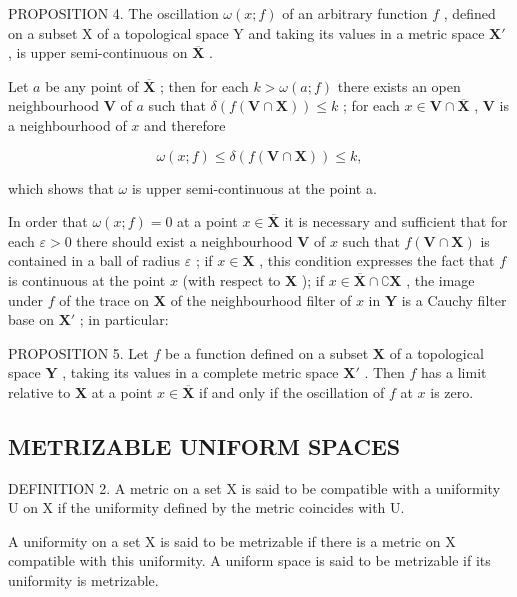PROPOSITION 4. The oscillation \(\omega(x; f)\) of an arbitrary function \(f\) , defined on a subset X of a topological space Y and taking its values in a metric space \(\mathbf{X}'\) , is upper semi-continuous on \(\overline{\mathbf{X}}\) .

Let \(a\) be any point of \(\overline{\mathbf{X}}\) ; then for each \(k > \omega(a; f)\) there exists an open neighbourhood \(\mathbf{V}\) of \(a\) such that \(\delta(f(\mathbf{V} \cap \mathbf{X})) \leqslant k\) ; for each \(x \in \mathbf{V} \cap \overline{\mathbf{X}}\) , \(\mathbf{V}\) is a neighbourhood of \(x\) and therefore

\[
\omega (x; f) \leqslant \delta (f (\mathbf {V} \cap \mathbf {X})) \leqslant k,
\]

which shows that \(\omega\) is upper semi-continuous at the point a.

In order that \(\omega(x; f) = 0\) at a point \(x \in \overline{\mathbf{X}}\) it is necessary and sufficient that for each \(\varepsilon > 0\) there should exist a neighbourhood \(\mathbf{V}\) of \(x\) such that \(f(\mathbf{V} \cap \mathbf{X})\) is contained in a ball of radius \(\varepsilon\) ; if \(x \in \mathbf{X}\) , this condition expresses the fact that \(f\) is continuous at the point \(x\) (with respect to \(\mathbf{X}\) ); if \(x \in \overline{\mathbf{X}} \cap \complement \mathbf{X}\) , the image under \(f\) of the trace on \(\mathbf{X}\) of the neighbourhood filter of \(x\) in \(\mathbf{Y}\) is a Cauchy filter base on \(\mathbf{X}'\) ; in particular:

PROPOSITION 5. Let \(f\) be a function defined on a subset \(\mathbf{X}\) of a topological space \(\mathbf{Y}\) , taking its values in a complete metric space \(\mathbf{X}'\) . Then \(f\) has a limit relative to \(\mathbf{X}\) at a point \(x \in \overline{\mathbf{X}}\) if and only if the oscillation of \(f\) at \(x\) is zero.

\subsection{METRIZABLE UNIFORM SPACES}

DEFINITION 2. A metric on a set X is said to be compatible with a uniformity U on X if the uniformity defined by the metric coincides with U.

A uniformity on a set X is said to be metrizable if there is a metric on X compatible with this uniformity. A uniform space is said to be metrizable if its uniformity is metrizable.

